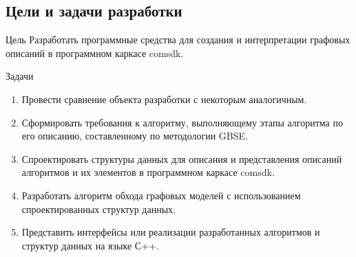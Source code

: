 \subsection{Цели и задачи разработки}
\begin{frame}

  \begin{block}{Цель}
    Разработать программные средства для создания и интерпретации графовых описаний в программном каркасе comsdk.
  \end{block}

  \begin{block}{Задачи}
    \begin{enumerate}
      \item Провести сравнение объекта разработки с некоторым аналогичным.
      \item Сформировать требования к алгоритму, выполняющему этапы алгоритма по его описанию, составленному по методологии GBSE.
      \item Спроектировать структуры данных для описания и представления описаний алгоритмов и их элементов в программном каркасе comsdk.
      \item Разработать алгоритм обхода графовых моделей с использованием спроектированных структур данных.
      \item Представить интерфейсы или реализации разработанных алгоритмов и структур данных на языке С++.
    \end{enumerate}
  \end{block}

\end{frame}


